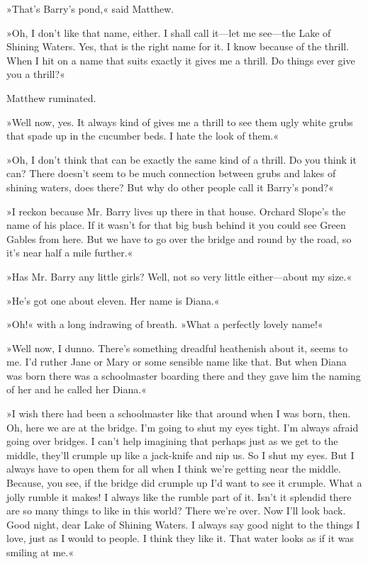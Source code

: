 »That's Barry's pond,« said Matthew.

»Oh, I don't like that name, either. I shall call it—let me see—the Lake of Shining Waters. Yes, that is the right name for it. I know because of the thrill. When I hit on a name that suits exactly it gives me a thrill. Do things ever give you a thrill?«

Matthew ruminated.

»Well now, yes. It always kind of gives me a thrill to see them ugly white grubs that spade up in the cucumber beds. I hate the look of them.«

»Oh, I don't think that can be exactly the same kind of a thrill. Do you think it can? There doesn't seem to be much connection between grubs and lakes of shining waters, does there? But why do other people call it Barry's pond?«

»I reckon because Mr. Barry lives up there in that house. Orchard Slope's the name of his place. If it wasn't for that big bush behind it you could see Green Gables from here. But we have to go over the bridge and round by the road, so it's near half a mile further.«

»Has Mr. Barry any little girls? Well, not so very little either—about my size.«

»He's got one about eleven. Her name is Diana.«

»Oh!« with a long indrawing of breath. »What a perfectly lovely name!«

»Well now, I dunno. There's something dreadful heathenish about it, seems to me. I'd ruther Jane or Mary or some sensible name like that. But when Diana was born there was a schoolmaster boarding there and they gave him the naming of her and he called her Diana.«

»I wish there had been a schoolmaster like that around when I was born, then. Oh, here we are at the bridge. I'm going to shut my eyes tight. I'm always afraid going over bridges. I can't help imagining that perhaps just as we get to the middle, they'll crumple up like a jack-knife and nip us. So I shut my eyes. But I always have to open them for all when I think we're getting near the middle. Because, you see, if the bridge did crumple up I'd want to see it crumple. What a jolly rumble it makes! I always like the rumble part of it. Isn't it splendid there are so many things to like in this world? There we're over. Now I'll look back. Good night, dear Lake of Shining Waters. I always say good night to the things I love, just as I would to people. I think they like it. That water looks as if it was smiling at me.«

